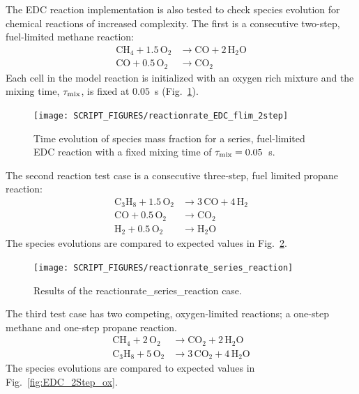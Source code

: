 \documentclass[11pt]{book}
\begin{document}
The EDC reaction implementation is also tested to check species evolution for chemical reactions of increased complexity. The first is a consecutive two-step, fuel-limited methane reaction:
\begin{align}\label{eq:2step_methane}
\mathrm{CH_4 + 1.5 \, O_2} &\rightarrow  \mathrm{CO + 2 \, H_2O} \\
\nonumber \mathrm{CO + 0.5 \, O_2} &\rightarrow \mathrm{CO_2}
\end{align}
Each cell in the model reaction is initialized with an oxygen rich mixture and the mixing time, $\tau_{\rm mix}$, is fixed at $0.05$~s (Fig.~\ref{fig:EDC_2Step_fuel}).

\begin{figure}[!ht]
\centering
\texttt{[image: SCRIPT\_FIGURES/reactionrate\_EDC\_flim\_2step]}
\caption[Species evolution in 2-step methane EDC reaction]{Time evolution of species mass fraction for a series, fuel-limited EDC reaction with a fixed mixing time of $\tau_{\rm mix}=0.05$~s.}
\label{fig:EDC_2Step_fuel}
\end{figure}

The second reaction test case is a consecutive three-step, fuel limited propane reaction:
\begin{align}\label{eq:3step_propane}
\mathrm{C_3H_8 + 1.5 \, O_2} &\rightarrow  \mathrm{3 \,CO + 4 \, H_2} \\
\nonumber \mathrm{CO + 0.5 \, O_2} &\rightarrow \mathrm{CO_2} \\
\nonumber \mathrm{H_2 + 0.5 \, O_2} &\rightarrow \mathrm{H_2O}
\end{align}
The species evolutions are compared to expected values in Fig.~\ref{fig:reactionrate_series_reaction}.

\begin{figure}[!ht]
\centering
\texttt{[image: SCRIPT\_FIGURES/reactionrate\_series\_reaction]}
\caption[Results of the {\ct reactionrate\_series\_reaction} case]{Results of the {\ct reactionrate\_series\_reaction} case.}
\label{fig:reactionrate_series_reaction}
\end{figure}

The third test case has two competing, oxygen-limited reactions; a one-step methane and one-step propane reaction.
\begin{align}\label{eq:2step_o2_lim}
\mathrm{CH_4 + 2 \, O_2} &\rightarrow  \mathrm{CO_2 + 2 \, H_2O} \\
\nonumber \mathrm{C_3H_8 + 5 \, O_2} &\rightarrow \mathrm{3 \,CO_2 + 4 \, H_2O}
\end{align}
The species evolutions are compared to expected values in Fig.~\ref{fig:EDC_2Step_ox}.
\end{document}
